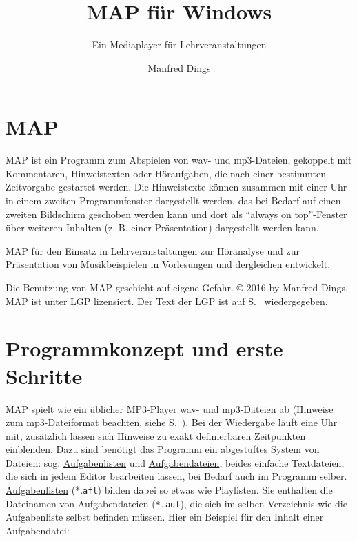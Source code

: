 \documentclass[a4paper,DIV=11
]{scrartcl}
\author{Manfred Dings}
\title{MAP für Windows}
\subtitle{Ein Mediaplayer für Lehrveranstaltungen}
\begin{document}
\maketitle


\tableofcontents

\hypertarget{map}{%
\section{MAP}\label{map}}

MAP ist ein Programm zum Abspielen von wav- und mp3-Dateien, gekoppelt
mit Kommentaren, Hinweistexten oder Höraufgaben, die nach einer
bestimmten Zeitvorgabe gestartet werden. Die Hinweistexte können
zusammen mit einer Uhr in einem zweiten Programmfenster dargestellt
werden, das bei Bedarf auf einen zweiten Bildschirm geschoben werden
kann und dort als "`always on top"'-Fenster über weiteren Inhalten (z.
B. einer Präsentation) dargestellt werden kann.

MAP für den Einsatz in Lehrveranstaltungen zur Höranalyse und zur
Präsentation von Musikbeispielen in Vorlesungen und dergleichen
entwickelt.

Die Benutzung von MAP geschieht auf eigene Gefahr. © 2016 by Manfred
Dings. MAP ist unter LGP lizensiert. Der Text der LGP ist auf S.~\pageref{lizenz} wiedergegeben.

\hypertarget{programmkonzept-und-erste-schritte}{%
\section{Programmkonzept und erste
Schritte}\label{programmkonzept-und-erste-schritte}}

MAP spielt wie ein üblicher MP3-Player wav- und mp3-Dateien ab
(\protect\hyperlink{FormatSounddateien}{Hinweise zum mp3-Dateiformat}
beachten, siehe S.~\pageref{format-der-sounddateien}). Bei der Wiedergabe läuft eine Uhr mit, zusätzlich lassen sich
Hinweise zu exakt definierbaren Zeitpunkten einblenden. Dazu sind
benötigt das Programm ein abgestuftes System von Dateien: sog.
\protect\hyperlink{aufgabenlisten}{Aufgabenlisten} und
\protect\hyperlink{aufgabendateien}{Aufgabendateien}, beides einfache
Textdateien, die sich in jedem Editor bearbeiten lassen, bei Bedarf auch
\protect\hyperlink{BefehleImMenuAufgabeneditor}{im Programm selber}.
\protect\hyperlink{aufgabenlisten}{Aufgabenlisten} (*.\texttt{afl})
bilden dabei so etwas wie Playlisten. Sie enthalten die Dateinamen von
Aufgabendateien (\texttt{*.auf}), die sich im selben Verzeichnis wie die
Aufgabenliste selbst befinden müssen. Hier ein Beispiel für den Inhalt
einer Aufgabendatei:
\end{document}
